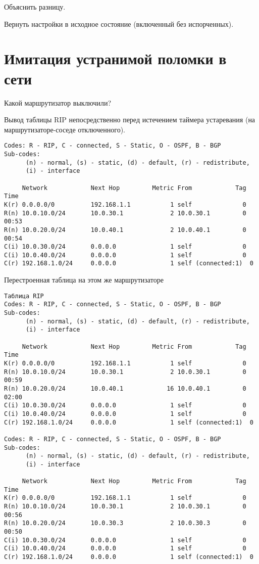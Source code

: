 \documentclass[a4paper,12pt]{article}
\begin{document}
Объяснить разницу.

Вернуть настройки в исходное состояние (включенный без испорченных).


\section{Имитация устранимой поломки в сети}

Какой маршрутизатор выключили?

Вывод таблицы RIP непосредственно перед истечением таймера устаревания (на маршрутизаторе-соседе отключенного).

\begin{Verbatim}
Codes: R - RIP, C - connected, S - Static, O - OSPF, B - BGP
Sub-codes:
      (n) - normal, (s) - static, (d) - default, (r) - redistribute,
      (i) - interface

     Network            Next Hop         Metric From            Tag Time
K(r) 0.0.0.0/0          192.168.1.1           1 self              0
R(n) 10.0.10.0/24       10.0.30.1             2 10.0.30.1         0 00:53
R(n) 10.0.20.0/24       10.0.40.1             2 10.0.40.1         0 00:54
C(i) 10.0.30.0/24       0.0.0.0               1 self              0
C(i) 10.0.40.0/24       0.0.0.0               1 self              0
C(r) 192.168.1.0/24     0.0.0.0               1 self (connected:1)  0
\end{Verbatim}

Перестроенная таблица на этом же маршрутизаторе

\begin{Verbatim}
Таблица RIP
Codes: R - RIP, C - connected, S - Static, O - OSPF, B - BGP
Sub-codes:
      (n) - normal, (s) - static, (d) - default, (r) - redistribute,
      (i) - interface

     Network            Next Hop         Metric From            Tag Time
K(r) 0.0.0.0/0          192.168.1.1           1 self              0
R(n) 10.0.10.0/24       10.0.30.1             2 10.0.30.1         0 00:59
R(n) 10.0.20.0/24       10.0.40.1            16 10.0.40.1         0 02:00
C(i) 10.0.30.0/24       0.0.0.0               1 self              0
C(i) 10.0.40.0/24       0.0.0.0               1 self              0
C(r) 192.168.1.0/24     0.0.0.0               1 self (connected:1)  0

Codes: R - RIP, C - connected, S - Static, O - OSPF, B - BGP
Sub-codes:
      (n) - normal, (s) - static, (d) - default, (r) - redistribute,
      (i) - interface

     Network            Next Hop         Metric From            Tag Time
K(r) 0.0.0.0/0          192.168.1.1           1 self              0
R(n) 10.0.10.0/24       10.0.30.1             2 10.0.30.1         0 00:56
R(n) 10.0.20.0/24       10.0.30.3             2 10.0.30.3         0 00:50
C(i) 10.0.30.0/24       0.0.0.0               1 self              0
C(i) 10.0.40.0/24       0.0.0.0               1 self              0
C(r) 192.168.1.0/24     0.0.0.0               1 self (connected:1)  0

\end{Verbatim}
\end{document}
